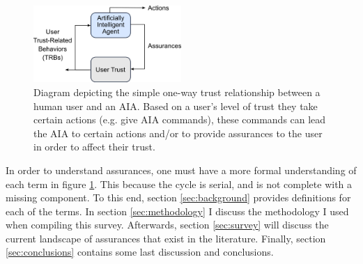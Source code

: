     \begin{figure}
        \centering
        \includegraphics[width=0.5\textwidth]{Figures/SimpleTrust_one_way.png}
        \caption{Diagram depicting the simple one-way trust relationship between a human user and an AIA. Based on a user's level of trust they take certain actions (e.g. give AIA commands), these commands can lead the AIA to certain actions and/or to provide assurances to the user in order to affect their trust.}
        \label{fig:SimpleTrust_one_way}
    \end{figure}

    In order to understand assurances, one must have a more formal understanding of each term in figure \ref{fig:SimpleTrust_one_way}. This because the cycle is serial, and is not complete with a missing component. To this end, section \ref{sec:background} provides definitions for each of the terms. In section \ref{sec:methodology} I discuss the methodology I used when compiling this survey. Afterwards, section \ref{sec:survey} will discuss the current landscape of assurances that exist in the literature. Finally, section \ref{sec:conclusions} contains some last discussion and conclusions.
